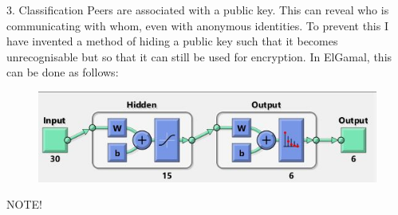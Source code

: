 \documentclass[ %
                    author={Liam O'Shea},
                supervisor={Dr. Sion Hanunna},
                     title={ZeroToHero},
                  subtitle={},
                    degree={Bsc},
                      year={2014} ]{poster}
\begin{document}
\begin{frame}{}
\begin{columns}[t]
    \begin{column}{0.422\linewidth}
    \begin{block}{\normalsize 3. Classification}
    \small Peers are associated with a public key. This can reveal who is communicating with whom, even with anonymous identities. To prevent this I have invented a method of hiding a public key such that it becomes unrecognisable but so that it can still be used for encryption. In ElGamal, this can be done as follows:
    \begin{figure}[h]
        \includegraphics{images/neuralnet}
    \end{figure}    
    NOTE!
    \end{block}
    \end{column}
    

\end{columns}
\end{frame}
\end{document}
